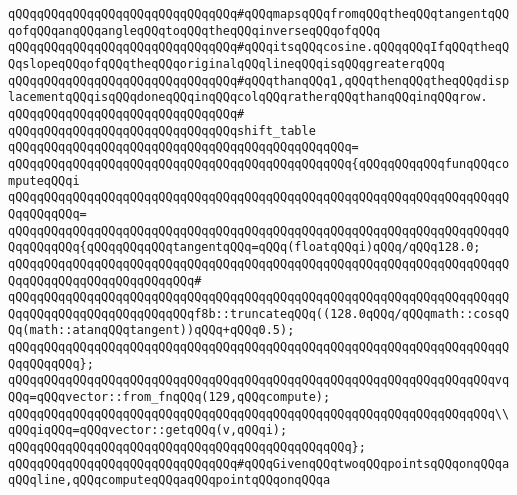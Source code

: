 \verb|qQQqqQQqqQQqqQQqqQQqqQQqqQQqqQQq#qQQqmapsqQQqfromqQQqtheqQQqtangentqQQqofqQQqanqQQqangleqQQqtoqQQqtheqQQqinverseqQQqofqQQq|\newline
\verb|qQQqqQQqqQQqqQQqqQQqqQQqqQQqqQQq#qQQqitsqQQqcosine.qQQqqQQqIfqQQqtheqQQqslopeqQQqofqQQqtheqQQqoriginalqQQqlineqQQqisqQQqgreaterqQQq|\newline
\verb|qQQqqQQqqQQqqQQqqQQqqQQqqQQqqQQq#qQQqthanqQQq1,qQQqthenqQQqtheqQQqdisplacementqQQqisqQQqdoneqQQqinqQQqcolqQQqratherqQQqthanqQQqinqQQqrow.|\newline
\verb|qQQqqQQqqQQqqQQqqQQqqQQqqQQqqQQq#|\newline
\verb|qQQqqQQqqQQqqQQqqQQqqQQqqQQqqQQqshift_table|\newline
\verb|qQQqqQQqqQQqqQQqqQQqqQQqqQQqqQQqqQQqqQQqqQQqqQQq=|\newline
\verb|qQQqqQQqqQQqqQQqqQQqqQQqqQQqqQQqqQQqqQQqqQQqqQQq{qQQqqQQqqQQqfunqQQqcomputeqQQqi|\newline
\verb|qQQqqQQqqQQqqQQqqQQqqQQqqQQqqQQqqQQqqQQqqQQqqQQqqQQqqQQqqQQqqQQqqQQqqQQqqQQqqQQq=|\newline
\verb|qQQqqQQqqQQqqQQqqQQqqQQqqQQqqQQqqQQqqQQqqQQqqQQqqQQqqQQqqQQqqQQqqQQqqQQqqQQqqQQq{qQQqqQQqqQQqtangentqQQq=qQQq(floatqQQqi)qQQq/qQQq128.0;|\newline
\verb|qQQqqQQqqQQqqQQqqQQqqQQqqQQqqQQqqQQqqQQqqQQqqQQqqQQqqQQqqQQqqQQqqQQqqQQqqQQqqQQqqQQqqQQqqQQqqQQq#|\newline
\verb|qQQqqQQqqQQqqQQqqQQqqQQqqQQqqQQqqQQqqQQqqQQqqQQqqQQqqQQqqQQqqQQqqQQqqQQqqQQqqQQqqQQqqQQqqQQqqQQqf8b::truncateqQQq((128.0qQQq/qQQqmath::cosqQQq(math::atanqQQqtangent))qQQq+qQQq0.5);|\newline
\verb|qQQqqQQqqQQqqQQqqQQqqQQqqQQqqQQqqQQqqQQqqQQqqQQqqQQqqQQqqQQqqQQqqQQqqQQqqQQqqQQq};|\newline
\newline
\verb|qQQqqQQqqQQqqQQqqQQqqQQqqQQqqQQqqQQqqQQqqQQqqQQqqQQqqQQqqQQqqQQqqQQqvqQQq=qQQqvector::from_fnqQQq(129,qQQqcompute);|\newline
\newline
\verb|qQQqqQQqqQQqqQQqqQQqqQQqqQQqqQQqqQQqqQQqqQQqqQQqqQQqqQQqqQQqqQQqqQQq\\qQQqiqQQq=qQQqvector::getqQQq(v,qQQqi);|\newline
\verb|qQQqqQQqqQQqqQQqqQQqqQQqqQQqqQQqqQQqqQQqqQQqqQQq};|\newline
\newline
\verb|qQQqqQQqqQQqqQQqqQQqqQQqqQQqqQQq#qQQqGivenqQQqtwoqQQqpointsqQQqonqQQqaqQQqline,qQQqcomputeqQQqaqQQqpointqQQqonqQQqa|\newline
